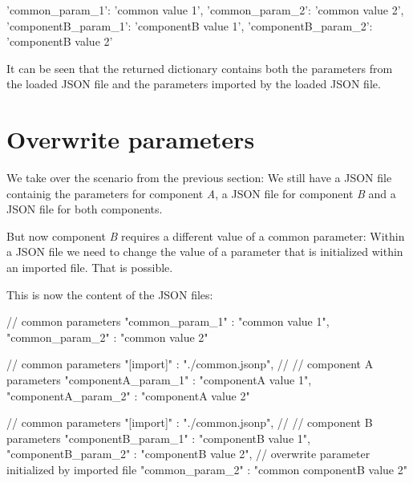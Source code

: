 \begin{pythonlog}
{'common_param_1': 'common value 1',
 'common_param_2': 'common value 2',
 'componentB_param_1': 'componentB value 1',
 'componentB_param_2': 'componentB value 2'}
\end{pythonlog}

It can be seen that the returned dictionary contains both the parameters from the loaded JSON file and the parameters imported by the loaded JSON file.



\section{Overwrite parameters}

We take over the scenario from the previous section: We still have a JSON file  containig the parameters for
component \textit{A}, a JSON file  for component \textit{B} and a JSON file  for both components.

But now component \textit{B} requires a different value of a common parameter: Within a JSON file we need to change the value of a parameter
that is initialized within an imported file. That is possible.

\vspace{2ex}

This is now the content of the JSON files:

\vspace{2ex}

\textbullet {}

\begin{pythoncode}
{
   // common parameters
   "common_param_1" : "common value 1",
   "common_param_2" : "common value 2"
}
\end{pythoncode}

\textbullet {}

\begin{pythoncode}
{
   // common parameters
   "[import]" : "./common.jsonp",
   //
   // component A parameters
   "componentA_param_1" : "componentA value 1",
   "componentA_param_2" : "componentA value 2"
}
\end{pythoncode}

\textbullet {}

\begin{pythoncode}[linebackgroundcolor=\hlcode{8,9}]
{
   // common parameters
   "[import]" : "./common.jsonp",
   //
   // component B parameters
   "componentB_param_1" : "componentB value 1",
   "componentB_param_2" : "componentB value 2",
   // overwrite parameter initialized by imported file
   "common_param_2" : "common componentB value 2"
}
\end{pythoncode}

